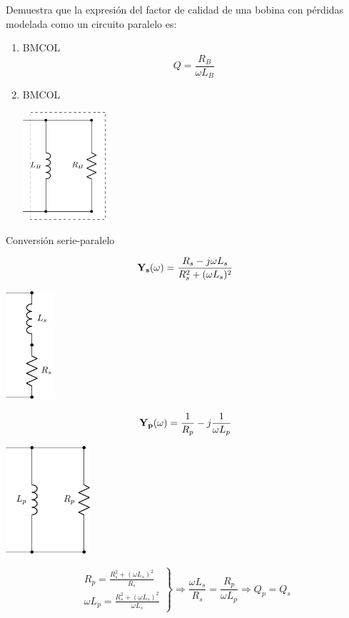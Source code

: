 Demuestra que la expresión del factor de calidad de una bobina con pérdidas modelada como un circuito paralelo es:
\begin{enumerate}
\item \hfill{}\textsc{BMCOL}
\label{sec:org17041f7}
\[
\boxed{Q = \frac{R_B}{\omega L_B}}
\]
\item \hfill{}\textsc{BMCOL}
\label{sec:orgf1bcb03}
\begin{center}
\includegraphics[height=4cm]{../figs/BobinaRealParalelo.pdf}
\end{center}
\end{enumerate}


{Conversión serie-paralelo}

\[
  \mathbf{Y_s}(\omega) = \frac{R_s - j\omega L_s}{R_s^2 + (\omega L_s)^2}
\]
\begin{center}
\includegraphics[height=4cm]{../figs/BobinaSerie.pdf}
\end{center}


\[
  \mathbf{Y_p}(\omega) = \frac{1}{R_p} - j\frac{1}{\omega L_p}
\]
\begin{center}
\includegraphics[height=4cm]{../figs/BobinaParalelo.pdf}
\end{center}


\[
\left.
\begin{array}{l}
  R_p = \frac{R_s^2 + (\omega L_s)^2}{R_s}\\
  \omega L_p = \frac{R_s^2 + (\omega L_s)^2}{\omega L_s}
\end{array}
\right\} \Rightarrow
\frac{\omega L_s}{R_s} = \frac{R_p}{\omega L_p} \Rightarrow \boxed{Q_p = Q_s}
\]


